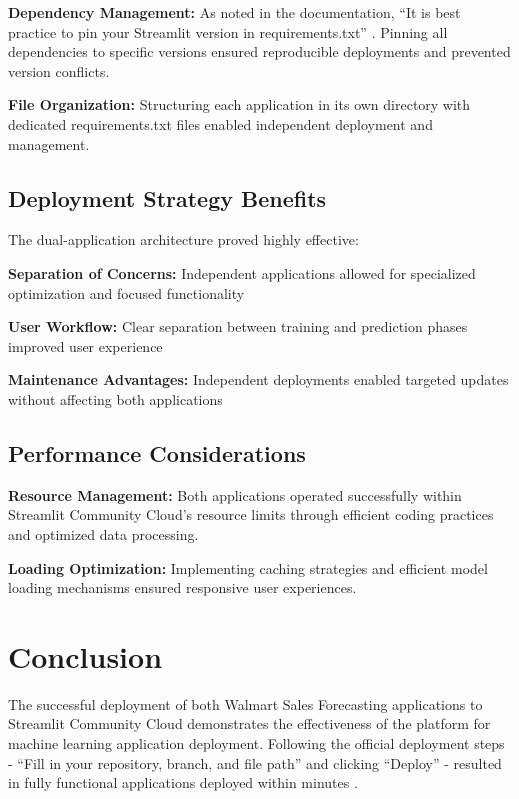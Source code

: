 \textbf{Dependency Management:} As noted in the documentation, ``It is best practice to pin your Streamlit version in requirements.txt'' \cite{Streamlit:2024manage}. Pinning all dependencies to specific versions ensured reproducible deployments and prevented version conflicts.

\textbf{File Organization:} Structuring each application in its own directory with dedicated requirements.txt files enabled independent deployment and management.

\subsection{Deployment Strategy Benefits}

The dual-application architecture proved highly effective:

\textbf{Separation of Concerns:} Independent applications allowed for specialized optimization and focused functionality

\textbf{User Workflow:} Clear separation between training and prediction phases improved user experience

\textbf{Maintenance Advantages:} Independent deployments enabled targeted updates without affecting both applications

\subsection{Performance Considerations}

\textbf{Resource Management:} Both applications operated successfully within Streamlit Community Cloud's resource limits through efficient coding practices and optimized data processing.

\textbf{Loading Optimization:} Implementing caching strategies and efficient model loading mechanisms ensured responsive user experiences.

\section{Conclusion}

The successful deployment of both Walmart Sales Forecasting applications to Streamlit Community Cloud demonstrates the effectiveness of the platform for machine learning application deployment. Following the official deployment steps - ``Fill in your repository, branch, and file path'' and clicking ``Deploy'' - resulted in fully functional applications deployed within minutes \cite{Streamlit:2024deploy}.

